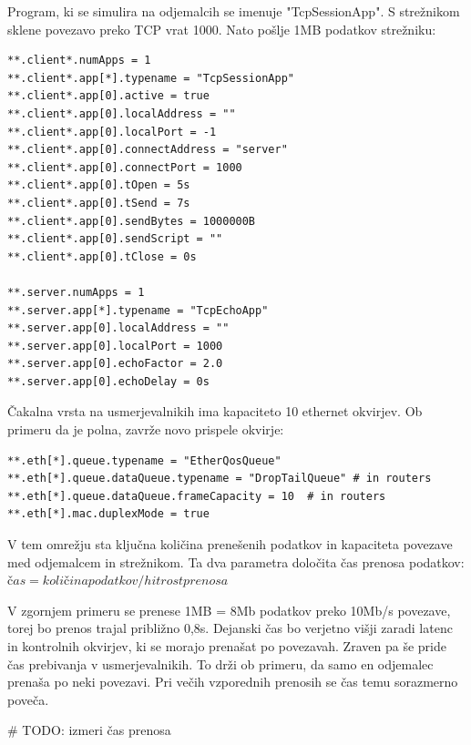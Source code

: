 \documentclass[11pt,a4paper,slovene]{myarticle}
\begin{document}
Program, ki se simulira na odjemalcih se imenuje "TcpSessionApp". S strežnikom sklene povezavo preko TCP vrat 1000. Nato pošlje 1MB podatkov strežniku:
\begin{lstlisting}[h]
**.client*.numApps = 1
**.client*.app[*].typename = "TcpSessionApp"
**.client*.app[0].active = true
**.client*.app[0].localAddress = ""
**.client*.app[0].localPort = -1
**.client*.app[0].connectAddress = "server"
**.client*.app[0].connectPort = 1000
**.client*.app[0].tOpen = 5s
**.client*.app[0].tSend = 7s
**.client*.app[0].sendBytes = 1000000B
**.client*.app[0].sendScript = ""
**.client*.app[0].tClose = 0s

**.server.numApps = 1
**.server.app[*].typename = "TcpEchoApp"
**.server.app[0].localAddress = ""
**.server.app[0].localPort = 1000
**.server.app[0].echoFactor = 2.0
**.server.app[0].echoDelay = 0s
\end{lstlisting}

Čakalna vrsta na usmerjevalnikih ima kapaciteto 10 ethernet okvirjev. Ob primeru da je polna, zavrže novo prispele okvirje:
\begin{lstlisting}[h]
**.eth[*].queue.typename = "EtherQosQueue"
**.eth[*].queue.dataQueue.typename = "DropTailQueue" # in routers
**.eth[*].queue.dataQueue.frameCapacity = 10  # in routers
**.eth[*].mac.duplexMode = true
\end{lstlisting}

V tem omrežju sta ključna količina prenešenih podatkov in kapaciteta povezave med odjemalcem in strežnikom. Ta dva parametra določita čas prenosa podatkov:
$čas = količina podatkov / hitrost prenosa$

V zgornjem primeru se prenese 1MB = 8Mb podatkov preko 10Mb/s povezave, torej bo prenos trajal približno 0,8s. Dejanski čas bo verjetno višji zaradi latenc in kontrolnih okvirjev, ki se morajo prenašat po povezavah.
Zraven pa še pride čas prebivanja v usmerjevalnikih.
To drži ob primeru, da samo en odjemalec prenaša po neki povezavi. Pri večih vzporednih prenosih se čas temu sorazmerno poveča.

# TODO: izmeri čas prenosa
\end{document}
